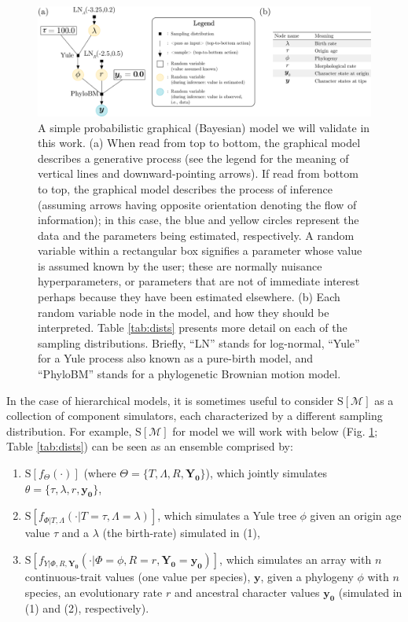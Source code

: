 \documentclass[oneside]{article}
\begin{document}
\begin{figure}%
  \centering
  \includegraphics[width=\linewidth]{../figures/graphical_model_manual.pdf}    
  \caption{
    A simple probabilistic graphical (Bayesian) model we will validate in this work.
    (a) When read from top to bottom, the graphical model describes a generative process (see the legend for the meaning of vertical lines and downward-pointing arrows).
    If read from bottom to top, the graphical model describes the process of inference (assuming arrows having opposite orientation denoting the flow of information); in this case, the blue and yellow circles represent the data and the parameters being estimated, respectively.
    A random variable within a rectangular box signifies a parameter whose value is assumed known by the user; these are normally nuisance hyperparameters, or parameters that are not of immediate interest perhaps because they have been estimated elsewhere.
    (b) Each random variable node in the model, and how they should be interpreted.
    Table \ref{tab:dists} presents more detail on each of the sampling distributions.
    Briefly, ``LN'' stands for log-normal, ``Yule'' for a Yule process also known as a pure-birth model, and ``PhyloBM'' stands for a phylogenetic Brownian motion model.
  }  
  \label{fig:pgm} 
\end{figure}
 
In the case of hierarchical models, it is sometimes useful to consider $\text{S}[\mathcal{M}]$ as a collection of component simulators, each characterized by a different sampling distribution.
For example, $\text{S}[\mathcal{M}]$ for model we will work with below (Fig. \ref{fig:pgm}; Table \ref{tab:dists}) can be seen as an ensemble comprised by:

\begin{enumerate}
  \item $\text{S}[f_\Theta(\cdot)]$ (where $\Theta = \{T,\Lambda, R, \boldsymbol{Y_0}\}$), which jointly simulates $\theta=\{\tau,\lambda,r,\boldsymbol{y_0}\}$,
  \item $\text{S}[f_{\Phi|T,\Lambda}(\cdot|T=\tau,\Lambda=\lambda)]$, which simulates a Yule tree $\phi$ given an origin age value $\tau$ and a $\lambda$ (the birth-rate) simulated in (1),
  \item $\text{S}[f_{Y|\Phi,R,\boldsymbol{Y_0}}(\cdot|\Phi=\phi,R=r,\boldsymbol{Y_0}=\boldsymbol{y_0})]$, which simulates an array with $n$ continuous-trait values (one value per species), $\boldsymbol{y}$, given a phylogeny $\phi$ with $n$ species, an evolutionary rate $r$ and ancestral character values $\boldsymbol{y_0}$ (simulated in (1) and (2), respectively).
\end{enumerate}
\end{document}
